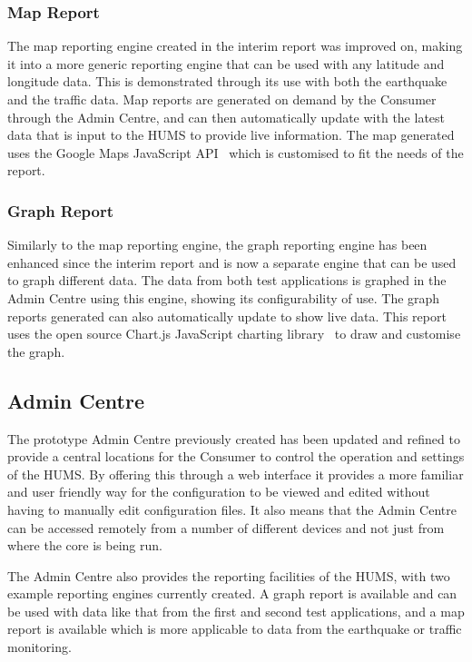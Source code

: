 \documentclass[10pt,a4paper]{article}
\begin{document}
\subsubsection{Map Report}
The map reporting engine created in the interim report was improved on, making it into a more generic reporting engine that can be used with any latitude and longitude data. This is demonstrated through its use with both the earthquake and the traffic data. Map reports are generated on demand by the Consumer through the Admin Centre, and can then automatically update with the latest data that is input to the HUMS to provide live information. The map generated uses the Google Maps JavaScript API~\cite{g_maps} which is customised to fit the needs of the report.

\subsubsection{Graph Report}
Similarly to the map reporting engine, the graph reporting engine has been enhanced since the interim report and is now a separate engine that can be used to graph different data. The data from both test applications is graphed in the Admin Centre using this engine, showing its configurability of use. The graph reports generated can also automatically update to show live data. This report uses the open source Chart.js JavaScript charting library~\cite{chart_js} to draw and customise the graph.

\subsection{Admin Centre}
\label{sec:admin}

The prototype Admin Centre previously created has been updated and refined to provide a central locations for the Consumer to control the operation and settings of the HUMS. By offering this through a web interface it provides a more familiar and user friendly way for the configuration to be viewed and edited without having to manually edit configuration files. It also means that the Admin Centre can be accessed remotely from a number of different devices and not just from where the core is being run.

The Admin Centre also provides the reporting facilities of the HUMS, with two example reporting engines currently created. A graph report is available and can be used with data like that from the first and second test applications, and a map report is available which is more applicable to data from the earthquake or traffic monitoring.
\end{document}
